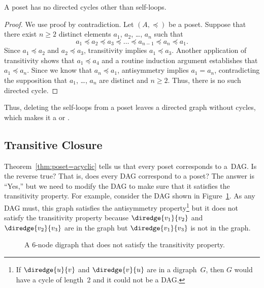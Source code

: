 \begin{theorem}\label{thm:poset=acyclic}
A poset has no directed cycles other than self-loops.
\end{theorem}

\begin{proof}

We use proof by contradiction.  Let $(A, \preceq)$ be a poset.
Suppose that there exist $n \ge 2$ distinct elements $a_1$, $a_2$,
\dots, $a_n$ such that
\begin{equation*}
    a_1 \preceq a_2 \preceq a_3 \preceq \dots \preceq a_{n - 1}
    \preceq a_n \preceq a_1.
\end{equation*}
Since $a_1 \preceq a_2$ and $a_2 \preceq a_3$, transitivity implies
$a_1 \preceq a_3$.  Another application of transitivity shows that
$a_1 \preceq a_4$ and a routine induction argument establishes that
$a_1 \preceq a_n$.  Since we know that $a_n \preceq a_1$, antisymmetry
implies $a_1 = a_n$, contradicting the supposition that $a_1$, \dots,
$a_n$ are distinct and $n \ge 2$.  Thus, there is no such directed
cycle.
\end{proof}

Thus, deleting the self-loops from a poset leaves a directed graph
without cycles, which makes it a  or
.

\subsection{Transitive Closure}

Theorem~\ref{thm:poset=acyclic} tells us that every poset corresponds
to a~DAG\@.  Is the reverse true?  That is, does every DAG correspond
to a poset?  The answer is ``Yes,'' but we need to modify the DAG to
make sure that it satisfies the transitivity property.  For example,
consider the DAG shown in Figure~\ref{fig:7FJ}.  As any DAG must, this
graph satisfies the antisymmetry property\footnote{If
  $\diredge{u}{v}$ and $\diredge{v}{u}$ are in a digraph~$G$, then $G$
would have a cycle of length~2 and it could not be a DAG.} but it does
not satisfy the transitivity property because $\diredge{v_1}{v_2}$ and
$\diredge{v_2}{v_3}$ are in the graph but $\diredge{v_1}{v_3}$ is not
in the graph.

\begin{figure}



\caption{A 6-node digraph that does not satisfy the transitivity
  property.}

\label{fig:7FJ}

\end{figure}

